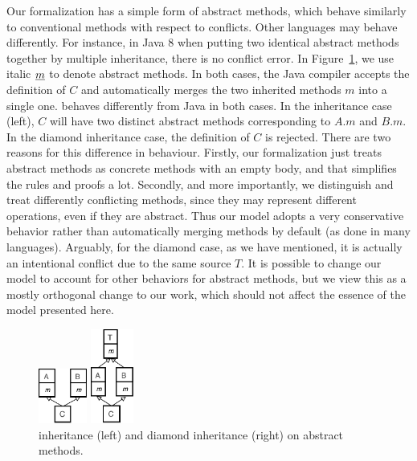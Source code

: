 Our formalization has a simple form of abstract methods, which behave similarly to conventional methods with respect to conflicts.
Other languages may behave differently. 
For instance, in Java 8 when putting two identical abstract methods together by multiple inheritance, there is no conflict error. In Figure~\ref{fig:abstractdiamond}, we use italic $\emph{m}$ to denote abstract methods. In both cases, the Java compiler accepts the definition of $C$ and automatically merges the two inherited methods $m$ into a single one. \MIM{} behaves differently from Java in both cases.
In the \wordfork{} inheritance case (left), $C$ will have two distinct abstract methods corresponding to $A.m$ and $B.m$. 
In the diamond inheritance case, the definition of $C$ is rejected. 
There are two reasons for this difference in behaviour. Firstly, our formalization just treats abstract methods as concrete methods with an empty body, and that simplifies
the rules and proofs a lot. Secondly, and more importantly, we distinguish and treat differently conflicting methods, since they may represent different operations, even if they are abstract. Thus our model adopts a very conservative behavior rather than automatically merging 
methods by default (as done in many languages). 
Arguably, for the diamond case, as we have mentioned, it is actually an intentional conflict due to the same source $T$.
It is possible to change our model to account for other behaviors for abstract methods, but we view this as a mostly 
orthogonal change to our work, which should not affect the essence of the model presented here.

\begin{figure}[t]
\saveSpaceFig
    \centering
    \begin{minipage}[t]{0.45\textwidth}
        \centering
        \includegraphics[width=1.6cm]{pics/P7.pdf}
    \end{minipage}
    \centering
    \hspace*{2pt}
    \begin{minipage}[t]{0.45\textwidth}
        \centering
        \includegraphics[width=1.4cm]{pics/P8.pdf}
    \end{minipage}  
    \caption{\wordFork{} inheritance (left) and diamond inheritance (right) on abstract methods.}\label{fig:abstractdiamond}
\saveSpaceFig
\end{figure}

